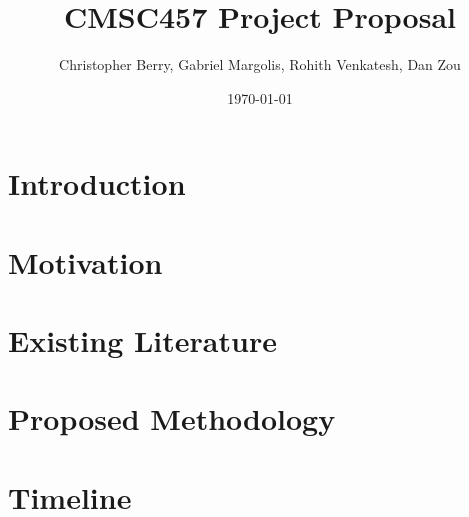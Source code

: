 \documentclass[letter,draft]{article}
\title{CMSC457 Project Proposal}
\author{Christopher Berry, Gabriel Margolis, Rohith Venkatesh, Dan Zou}
\date{\today}
\begin{document}
\maketitle

\section{Introduction}
\section{Motivation}
\section{Existing Literature}
\section{Proposed Methodology}
\section{Timeline}
\end{document}
